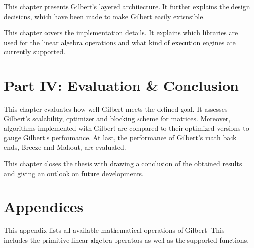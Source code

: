 \vspace{3mm}


\noindent This chapter presents Gilbert's layered architecture.
It further explains the design decisions, which have been made to make Gilbert easily extensible.

\vspace{3mm}


\noindent This chapter covers the implementation details.
It explains which libraries are used for the linear algebra operations and what kind of execution engines are currently supported.

\vspace{3mm}

\section*{Part IV: Evaluation \& Conclusion}

\vspace{3mm}


This chapter evaluates how well Gilbert meets the defined goal.
It assesses Gilbert's scalability, optimizer and blocking scheme for matrices.
Moreover, algorithms implemented with Gilbert are compared to their optimized versions to gauge Gilbert's performance.
At last, the performance of Gilbert's math back ends, Breeze and Mahout, are evaluated.

\vspace{3mm}


This chapter closes the thesis with drawing a conclusion of the obtained results and giving an outlook on future developments.

\vspace{3mm}

\section*{Appendices}

\vspace{3mm}


This appendix lists all available mathematical operations of Gilbert.
This includes the primitive linear algebra operators as well as the supported functions.